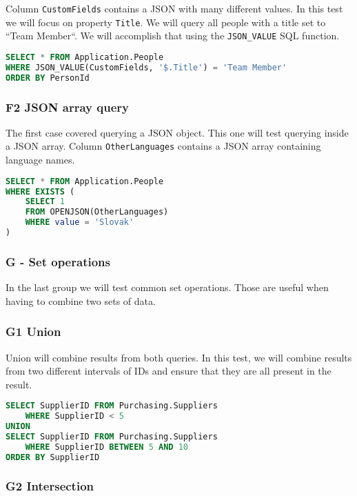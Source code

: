 Column \texttt{CustomFields} contains a JSON with many different values. In this test we will focus on property \texttt{Title}. We will query all people with a title set to ``Team Member``.
We will accomplish that using the \texttt{JSON\_VALUE} SQL function.

\begin{lstlisting}[language=SQL]
SELECT * FROM Application.People
WHERE JSON_VALUE(CustomFields, '$.Title') = 'Team Member'
ORDER BY PersonId
\end{lstlisting}

\subsubsection*{F2 JSON array query} \label{query:f2}

The first case covered querying a JSON object. This one will test querying inside a JSON array. Column \texttt{OtherLanguages} contains a JSON array containing language names.

\begin{lstlisting}[language=SQL]
SELECT * FROM Application.People
WHERE EXISTS (
    SELECT 1
    FROM OPENJSON(OtherLanguages)
    WHERE value = 'Slovak'
)
\end{lstlisting}

\subsubsection{G - Set operations}

In the last group we will test common set operations. Those are useful when having to combine two sets of data.

\subsubsection*{G1 Union} \label{query:g1}

Union will combine results from both queries. In this test, we will combine results from two different intervals of IDs and ensure that they are all present in the result.

\begin{lstlisting}[language=SQL]
SELECT SupplierID FROM Purchasing.Suppliers 
    WHERE SupplierID < 5
UNION
SELECT SupplierID FROM Purchasing.Suppliers 
    WHERE SupplierID BETWEEN 5 AND 10
ORDER BY SupplierID
\end{lstlisting}

\subsubsection*{G2 Intersection} \label{query:g2}


